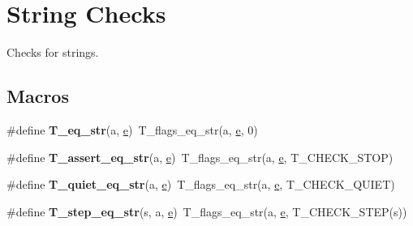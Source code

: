\hypertarget{group__RTEMSTestFrameworkChecksStr}{}\section{String Checks}
\label{group__RTEMSTestFrameworkChecksStr}


Checks for strings.  


\subsection*{Macros}
\begin{DoxyCompactItemize}
\item 
\mbox{\label{group__RTEMSTestFrameworkChecksStr_gaf5a8fb916f5f94ba9e16e88b9f63bccd}} 
\#define {\bfseries T\+\_\+eq\+\_\+str}(a,  \mbox{\hyperlink{sun4u_2tte_8h_a8b0b9ed08e0e18920ec2682f48228c27}{e}})~T\+\_\+flags\+\_\+eq\+\_\+str(a, \mbox{\hyperlink{sun4u_2tte_8h_a8b0b9ed08e0e18920ec2682f48228c27}{e}}, 0)
\item 
\mbox{\label{group__RTEMSTestFrameworkChecksStr_ga978fae304d996c1678548d227445e34d}} 
\#define {\bfseries T\+\_\+assert\+\_\+eq\+\_\+str}(a,  \mbox{\hyperlink{sun4u_2tte_8h_a8b0b9ed08e0e18920ec2682f48228c27}{e}})~T\+\_\+flags\+\_\+eq\+\_\+str(a, \mbox{\hyperlink{sun4u_2tte_8h_a8b0b9ed08e0e18920ec2682f48228c27}{e}}, T\+\_\+\+C\+H\+E\+C\+K\+\_\+\+S\+T\+OP)
\item 
\mbox{\label{group__RTEMSTestFrameworkChecksStr_ga442760021680b3d54ebd3b484b4a85ed}} 
\#define {\bfseries T\+\_\+quiet\+\_\+eq\+\_\+str}(a,  \mbox{\hyperlink{sun4u_2tte_8h_a8b0b9ed08e0e18920ec2682f48228c27}{e}})~T\+\_\+flags\+\_\+eq\+\_\+str(a, \mbox{\hyperlink{sun4u_2tte_8h_a8b0b9ed08e0e18920ec2682f48228c27}{e}}, T\+\_\+\+C\+H\+E\+C\+K\+\_\+\+Q\+U\+I\+ET)
\item 
\mbox{\label{group__RTEMSTestFrameworkChecksStr_gab810fc9a6e3a7fd592e5e4c027a4910b}} 
\#define {\bfseries T\+\_\+step\+\_\+eq\+\_\+str}(s,  a,  \mbox{\hyperlink{sun4u_2tte_8h_a8b0b9ed08e0e18920ec2682f48228c27}{e}})~T\+\_\+flags\+\_\+eq\+\_\+str(a, \mbox{\hyperlink{sun4u_2tte_8h_a8b0b9ed08e0e18920ec2682f48228c27}{e}}, T\+\_\+\+C\+H\+E\+C\+K\+\_\+\+S\+T\+EP(s))
\item 

\end{DoxyCompactItemize}
